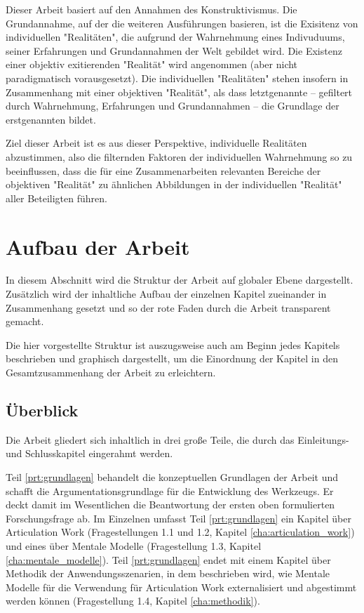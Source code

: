 Dieser Arbeit basiert auf den Annahmen des Konstruktivismus. Die Grundannahme, auf der die weiteren Ausführungen basieren, ist die Exisitenz von individuellen "Realitäten", die aufgrund der Wahrnehmung eines Indivuduums, seiner Erfahrungen und Grundannahmen der Welt gebildet wird. Die Existenz einer objektiv exitierenden "Realität" wird angenommen (aber nicht paradigmatisch vorausgesetzt). Die individuellen "Realitäten" stehen insofern in Zusammenhang mit einer objektiven "Realität", als dass letztgenannte -- gefiltert durch Wahrnehmung, Erfahrungen und Grundannahmen -- die Grundlage der erstgenannten bildet.

Ziel dieser Arbeit ist es aus dieser Perspektive, individuelle Realitäten abzustimmen, also die filternden Faktoren der individuellen Wahrnehmung so zu beeinflussen, dass die für eine Zusammenarbeiten relevanten Bereiche der objektiven "Realität" zu ähnlichen Abbildungen in der individuellen "Realität" aller Beteiligten führen.

\section{Aufbau der Arbeit} %
\label{sec:aufbau_der_arbeit}

In diesem Abschnitt wird die Struktur der Arbeit auf globaler Ebene dargestellt. Zusätzlich wird der inhaltliche Aufbau der einzelnen Kapitel zueinander in Zusammenhang gesetzt und so der rote Faden durch die Arbeit transparent gemacht.

Die hier vorgestellte Struktur ist auszugsweise auch am Beginn jedes Kapitels beschrieben und graphisch dargestellt, um die Einordnung der Kapitel in den Gesamtzusammenhang der Arbeit zu erleichtern.

\subsection{Überblick} %
\label{sub:aufbau_ueberblick}

Die Arbeit gliedert sich inhaltlich in drei große Teile, die durch das Einleitungs- und Schlusskapitel eingerahmt werden.

Teil \ref{prt:grundlagen} behandelt die konzeptuellen Grundlagen der Arbeit und schafft die Argumentationsgrundlage für die Entwicklung des Werkzeugs. Er deckt damit im Wesentlichen die Beantwortung der ersten oben formulierten Forschungsfrage ab. Im Einzelnen umfasst Teil \ref{prt:grundlagen} ein Kapitel über Articulation Work (Fragestellungen 1.1 und 1.2, Kapitel \ref{cha:articulation_work}) und eines über Mentale Modelle (Fragestellung 1.3, Kapitel \ref{cha:mentale_modelle}). Teil \ref{prt:grundlagen} endet mit einem Kapitel über Methodik der Anwendungsszenarien, in dem beschrieben wird, wie Mentale Modelle für die Verwendung für Articulation Work externalisiert und abgestimmt werden können (Fragestellung 1.4, Kapitel \ref{cha:methodik}).


